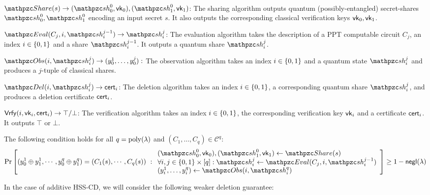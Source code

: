 \begin{description}

\item [Syntax:] $ $
\item $\Sh(s) \rightarrow (\qsh_0^0, \vk_0), (\qsh_1^0,
\vk_1)$: The sharing algorithm outputs quantum
(possibly-entangled) secret-shares $\qsh_0^0, \qsh_1^0$ encoding an
input secret $s$. It also outputs the corresponding classical
verification keys $\mathsf{vk}_0, \mathsf{vk}_1$.

\item $\Ev(C_j, i, \qsh_i^{j-1}) \rightarrow \qsh_i^{j}$: The
evaluation algorithm takes the description of a PPT computable
circuit $C_j$, an index $i \in \{0,1\}$ and a share
$\qsh_i^{j-1}$. It outputs a quantum share $\qsh_i^j$.

\item $\Obs(i, \qsh_i^j) \rightarrow (y_0^1, \ldots, y_0^j):$ The
observation algorithm takes an index $i \in \{0,1\}$ and a quantum
state $\qsh_i^j$ and produces a $j$-tuple of classical shares.

\item $\Del(i, \qsh_i^j) \rightarrow \cert_i$: The deletion
algorithm takes an index $i \in \{0,1\}$, a corresponding quantum share
$\qsh_i^j$, and produces a deletion certificate $\mathsf{cert}_i$.

\item $\mathsf{Vrfy}(i, \mathsf{vk}_i, \mathsf{cert}_i) \rightarrow \top/\bot$: The
verification algorithm takes an index $i \in \{0,1\}$, the
corresponding verification key $\mathsf{vk}_i$ and a certificate $\mathsf{cert}_i$.
It outputs $\top$ or $\bot$.

\item [Evaluation Correctness:] The following
condition holds for all $q = {\mathrm{poly}}(\lambda)$ and $(C_1, \ldots, C_q)
\in \mathcal{C}^q$:
\begin{align}
\Pr\left[
(y_0^1 \xor y_1^1, \cdots, y_0^q \xor y_1^q) = (C_1(s), \cdots,
C_q(s))
\ :
\begin{array}{ll}
(\qsh_0^0, \vk_0), (\qsh_1^0, \vk_1) \gets \Sh(s)\\
\forall i,j \in \bit \times [q]: \qsh_i^j
\leftarrow \Ev(C_j, i,
\qsh_i^{j-1})\\
(y_i^1, \ldots, y_i^q) \leftarrow \Obs(i, \qsh_i^q)
\end{array}
\right] \geq 1 - \negl(\secp)
\end{align}

In the case of additive HSS-CD, we will consider the following
weaker deletion guarantee: 


\end{description}
